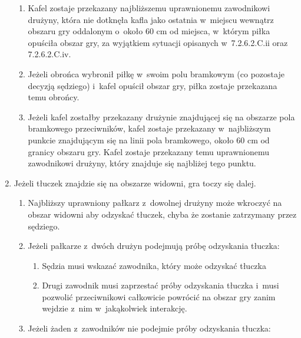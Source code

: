 \documentclass[12pt]{article}
\begin{document}
\begin{enumerate}
	      \begin{enumerate}
		      \item
		            Kafel zostaje przekazany najbliższemu uprawnionemu zawodnikowi
		            drużyny, która nie dotknęła kafla jako ostatnia w~miejscu wewnątrz
		            obszaru gry oddalonym o~około 60 cm od miejsca, w~którym piłka
		            opuściła obszar gry, za wyjątkiem sytuacji opisanych w~7.2.6.2.C.ii
		            oraz 7.2.6.2.C.iv.
		      \item
		            Jeżeli obrońca wybronił piłkę w~swoim polu bramkowym (co pozostaje
		            decyzją sędziego) i~kafel opuścił obszar gry, piłka zostaje
		            przekazana temu obrońcy.
		      \item
		            Jeżeli kafel zostałby przekazany drużynie znajdującej się na
		            obszarze pola bramkowego przeciwników, kafel zostaje przekazany w~najbliższym punkcie znajdującym się na linii pola bramkowego, około
		            60 cm od granicy obszaru gry. Kafel zostaje przekazany temu
		            uprawnionemu zawodnikowi drużyny, który znajduje się najbliżej tego
		            punktu.
	      \end{enumerate}
	\item
	      Jeżeli tłuczek znajdzie się na obszarze widowni, gra toczy się dalej.

	      \begin{enumerate}
		      \item
		            Najbliższy uprawniony pałkarz z~dowolnej drużyny może wkroczyć na
		            obszar widowni aby odzyskać tłuczek, chyba że zostanie zatrzymany
		            przez sędziego.
		      \item
		            Jeżeli pałkarze z~dwóch drużyn podejmują próbę odzyskania tłuczka:

		            \begin{enumerate}
			            \item
			                  Sędzia musi wskazać zawodnika, który może odzyskać tłuczka
			            \item
			                  Drugi zawodnik musi zaprzestać próby odzyskania tłuczka i~musi
			                  pozwolić przeciwnikowi całkowicie powrócić na obszar gry zanim
			                  wejdzie z~nim w~jakąkolwiek interakcję.
		            \end{enumerate}
		      \item
		            Jeżeli żaden z~zawodników nie podejmie próby odzyskania tłuczka:


\end{enumerate}
\end{enumerate}
\end{document}
